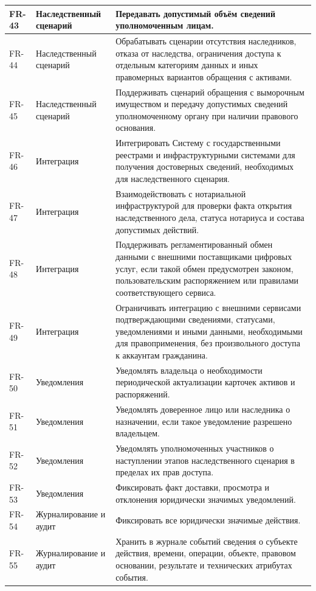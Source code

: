 \begin{longtable}{|P{1.45cm}|P{3.35cm}|P{10.7cm}|}
FR-43 & Наследственный сценарий & Передавать допустимый объём сведений уполномоченным лицам.\\ \hline
FR-44 & Наследственный сценарий & Обрабатывать сценарии отсутствия наследников, отказа от наследства, ограничения доступа к отдельным категориям данных и иных правомерных вариантов обращения с активами.\\ \hline
FR-45 & Наследственный сценарий & Поддерживать сценарий обращения с выморочным имуществом и передачу допустимых сведений уполномоченному органу при наличии правового основания.\\ \hline
FR-46 & Интеграция & Интегрировать Систему с государственными реестрами и инфраструктурными системами для получения достоверных сведений, необходимых для наследственного сценария.\\ \hline
FR-47 & Интеграция & Взаимодействовать с нотариальной инфраструктурой для проверки факта открытия наследственного дела, статуса нотариуса и состава допустимых действий.\\ \hline
FR-48 & Интеграция & Поддерживать регламентированный обмен данными с внешними поставщиками цифровых услуг, если такой обмен предусмотрен законом, пользовательским распоряжением или правилами соответствующего сервиса.\\ \hline
FR-49 & Интеграция & Ограничивать интеграцию с внешними сервисами подтверждающими сведениями, статусами, уведомлениями и иными данными, необходимыми для правоприменения, без произвольного доступа к аккаунтам гражданина.\\ \hline
FR-50 & Уведомления & Уведомлять владельца о необходимости периодической актуализации карточек активов и распоряжений.\\ \hline
FR-51 & Уведомления & Уведомлять доверенное лицо или наследника о назначении, если такое уведомление разрешено владельцем.\\ \hline
FR-52 & Уведомления & Уведомлять уполномоченных участников о наступлении этапов наследственного сценария в пределах их прав доступа.\\ \hline
FR-53 & Уведомления & Фиксировать факт доставки, просмотра и отклонения юридически значимых уведомлений.\\ \hline
FR-54 & Журналирование и аудит & Фиксировать все юридически значимые действия.\\ \hline
FR-55 & Журналирование и аудит & Хранить в журнале событий сведения о субъекте действия, времени, операции, объекте, правовом основании, результате и технических атрибутах события.\\ \hline

\end{longtable}
